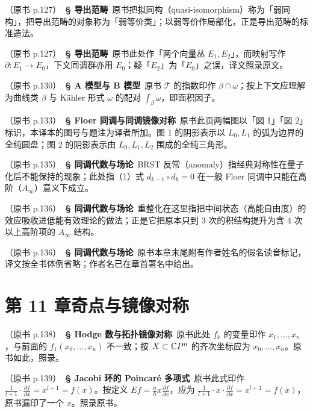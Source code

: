\noindent （原书 p.127）\ \textbf{§ 导出范畴}\ 原书把拟同构（quasi-isomorphism）称为「弱同构」，把导出范畴的对象称为「弱等价类」；以弱等价作局部化，正是导出范畴的标准造法。\par\smallskip

\noindent （原书 p.127）\ \textbf{§ 导出范畴}\ 原书此处作「两个向量丛 $E_1,E_2$」，而映射写作 $\partial:E_1\to E_0$，下文同调群亦用 $E_0$；疑「$E_2$」为「$E_0$」之误，译文照录原文。\par\smallskip

\noindent （原书 p.130）\ \textbf{§ A 模型与 B 模型}\ 原书 $\mathcal{T}$ 的指数印作 $\beta\cap\omega$；按上下文应理解为曲线类 $\beta$ 与 Kähler 形式 $\omega$ 的配对 $\int_\beta\omega$，即面积因子。\par\smallskip

\noindent （原书 p.133）\ \textbf{§ Floer 同调与同调镜像对称}\ 原书此页两幅图以「図 1」「図 2」标识，本译本的图号与题注为译者所加。图 1 的阴影表示以 $L_0,L_1$ 的弧为边界的全纯圆盘；图 2 的阴影表示由 $L_0,L_1,L_2$ 围成的全纯三角形。\par\smallskip

\noindent （原书 p.135）\ \textbf{§ 同调代数与场论}\ BRST 反常（anomaly）指经典对称性在量子化后不能保持的现象；此处指（1）式 $d_{k-1}\circ d_k=0$ 在一般 Floer 同调中只能在高阶（$A_\infty$）意义下成立。\par\smallskip

\noindent （原书 p.136）\ \textbf{§ 同调代数与场论}\ 重整化在这里指把中间状态（高能自由度）的效应吸收进低能有效理论的做法；正是它把原本只到 3 次的积结构提升为含 4 次以上高阶项的 $A_\infty$ 结构。\par\smallskip

\noindent （原书 p.136）\ \textbf{§ 同调代数与场论}\ 原书本章末尾附有作者姓名的假名读音标记，译文按全书体例省略；作者名已在章首署名中给出。\par\smallskip

\section*{第 11 章\quad 奇点与镜像对称}

\noindent （原书 p.138）\ \textbf{§ Hodge 数与拓扑镜像对称}\ 原书此处 $f_k$ 的变量印作 $x_1,\dots,x_n$，与前面的 $f_1(x_0,\dots,x_n)$ 不一致；按 $X\subset\mathbb{C}P^n$ 的齐次坐标应为 $x_0,\dots,x_n$。原书如此，照录。\par\smallskip

\noindent （原书 p.139）\ \textbf{§ Jacobi 环的 Poincaré 多项式}\ 原书此式印作 $\frac{1}{l+1}\cdot\frac{\partial f}{\partial x}=x^{l+1}=f(x)$。按定义 $Ef=\frac{a}{h}x\frac{\partial f}{\partial x}$，应为 $\frac{1}{l+1}\cdot x\cdot\frac{\partial f}{\partial x}=x^{l+1}=f(x)$，原书漏印了一个 $x$。照录原书。\par\smallskip

